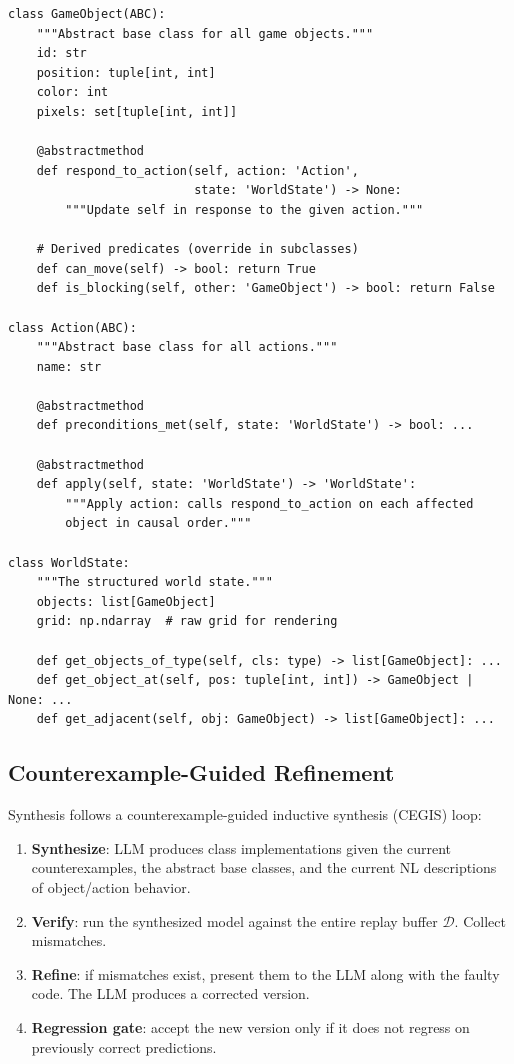 \documentclass{article}
\newcommand{\calD}{\mathcal{D}}
\begin{document}
\begin{verbatim}
class GameObject(ABC):
    """Abstract base class for all game objects."""
    id: str
    position: tuple[int, int]
    color: int
    pixels: set[tuple[int, int]]

    @abstractmethod
    def respond_to_action(self, action: 'Action',
                          state: 'WorldState') -> None:
        """Update self in response to the given action."""

    # Derived predicates (override in subclasses)
    def can_move(self) -> bool: return True
    def is_blocking(self, other: 'GameObject') -> bool: return False

class Action(ABC):
    """Abstract base class for all actions."""
    name: str

    @abstractmethod
    def preconditions_met(self, state: 'WorldState') -> bool: ...

    @abstractmethod
    def apply(self, state: 'WorldState') -> 'WorldState':
        """Apply action: calls respond_to_action on each affected
        object in causal order."""

class WorldState:
    """The structured world state."""
    objects: list[GameObject]
    grid: np.ndarray  # raw grid for rendering

    def get_objects_of_type(self, cls: type) -> list[GameObject]: ...
    def get_object_at(self, pos: tuple[int, int]) -> GameObject | None: ...
    def get_adjacent(self, obj: GameObject) -> list[GameObject]: ...
\end{verbatim}

\subsection{Counterexample-Guided Refinement}
\label{sec:cegis}

Synthesis follows a counterexample-guided inductive synthesis (CEGIS) loop:

\begin{enumerate}[nosep]
    \item \textbf{Synthesize}: LLM produces class implementations given
          the current counterexamples, the abstract base classes, and the
          current NL descriptions of object/action behavior.
    \item \textbf{Verify}: run the synthesized model against the entire
          replay buffer $\calD$.  Collect mismatches.
    \item \textbf{Refine}: if mismatches exist, present them to the LLM
          along with the faulty code.  The LLM produces a corrected version.
    \item \textbf{Regression gate}: accept the new version only if it does
          not regress on previously correct predictions.
\end{enumerate}
\end{document}
